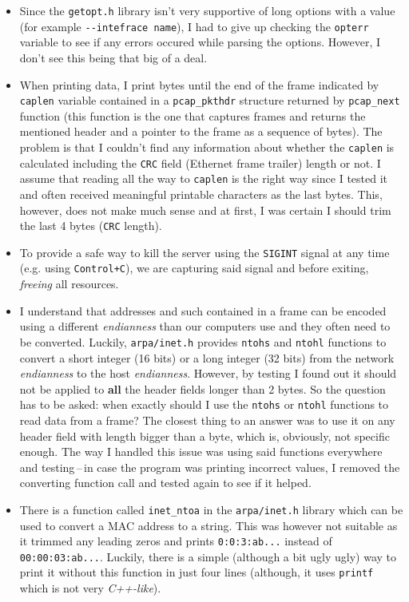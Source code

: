 \documentclass[a4paper]{article}
\begin{document}
  \begin{itemize}
    \item Since the \verb|getopt.h| library isn't very supportive of long 
      options with a value (for example \verb|--intefrace name|), I had to give
      up checking the \verb|opterr| variable to see if any errors occured while
      parsing the options. However, I don't see this being that big of a deal.
    \item When printing data, I print bytes until the end of the frame 
      indicated by \verb|caplen| variable contained in a \verb|pcap_pkthdr|
      structure returned by \verb|pcap_next| function (this function is the one
      that captures frames and returns the mentioned header and a pointer to 
      the frame as a sequence of bytes). The problem is that I couldn't find 
      any information about whether the \verb|caplen| is calculated including 
      the \verb|CRC| field (Ethernet frame trailer) length or not. I assume 
      that reading all the way to \verb|caplen| is the right way since I 
      tested it and often received meaningful printable characters as the last 
      bytes. This, however, does not make much sense and at first, I was 
      certain I should trim the last 4 bytes (\verb|CRC| length).
    \item To provide a safe way to kill the server using the \verb|SIGINT| 
      signal at any time (e.g. using \verb|Control+C|), we are capturing said 
      signal and before exiting, \textit{freeing} all resources.
    \item I understand that addresses and such contained in a frame can be 
      encoded using a different \textit{endianness} than our computers use
      and they often need to be converted. Luckily, \verb|arpa/inet.h| provides
      \verb|ntohs| and \verb|ntohl| functions to convert a short integer (16 
      bits) or a long integer (32 bits) from the network \textit{endianness} 
      to the host \textit{endianness}. However, by testing I found out it 
      should not be applied to \textbf{all} the header fields longer than 2 
      bytes. So the question has to be asked: when exactly should I use the 
      \verb|ntohs| or \verb|ntohl| functions to read data from a frame? The
      closest thing to an answer was to use it on any header field with
      length bigger than a byte, which is, obviously, not specific enough. The
      way I handled this issue was using said functions everywhere and 
      testing\,--\,in case the program was printing incorrect values, I removed
      the converting function call and tested again to see if it helped.
    \item There is a function called \verb|inet_ntoa| in the \verb|arpa/inet.h|
      library which can be used to convert a MAC address to a string. This was 
      however not suitable as it trimmed any leading zeros and prints
      \verb|0:0:3:ab...| instead of \verb|00:00:03:ab...|. Luckily, there is
      a simple (although a bit ugly ugly) way to print it without this function 
      in just four lines (although, it uses \verb|printf| which is not very 
      \textit{C++-like}).
  \end{itemize}
\end{document}
